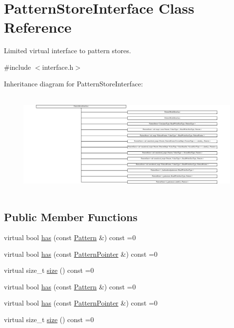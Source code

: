 \hypertarget{classPatternStoreInterface}{}\section{Pattern\+Store\+Interface Class Reference}
\label{classPatternStoreInterface}


Limited virtual interface to pattern stores.  




{\ttfamily \#include $<$interface.\+h$>$}

Inheritance diagram for Pattern\+Store\+Interface\+:\begin{figure}[H]
\begin{center}
\leavevmode
\includegraphics[height=5.318860cm]{classPatternStoreInterface}
\end{center}
\end{figure}
\subsection*{Public Member Functions}
\begin{DoxyCompactItemize}
\item 
virtual bool \hyperlink{classPatternStoreInterface_aec9f27496b38f8db1eced920fb2dc9fe}{has} (const \hyperlink{classPattern}{Pattern} \&) const  =0
\item 
virtual bool \hyperlink{classPatternStoreInterface_a6b3e80cd9021201ce8992ad6c293a354}{has} (const \hyperlink{classPatternPointer}{Pattern\+Pointer} \&) const  =0
\item 
virtual size\+\_\+t \hyperlink{classPatternStoreInterface_a225c319d318aad157512cd0001b05eb2}{size} () const  =0
\item 
virtual bool \hyperlink{classPatternStoreInterface_aec9f27496b38f8db1eced920fb2dc9fe}{has} (const \hyperlink{classPattern}{Pattern} \&) const  =0
\item 
virtual bool \hyperlink{classPatternStoreInterface_a6b3e80cd9021201ce8992ad6c293a354}{has} (const \hyperlink{classPatternPointer}{Pattern\+Pointer} \&) const  =0
\item 
virtual size\+\_\+t \hyperlink{classPatternStoreInterface_a225c319d318aad157512cd0001b05eb2}{size} () const  =0
\end{DoxyCompactItemize}


